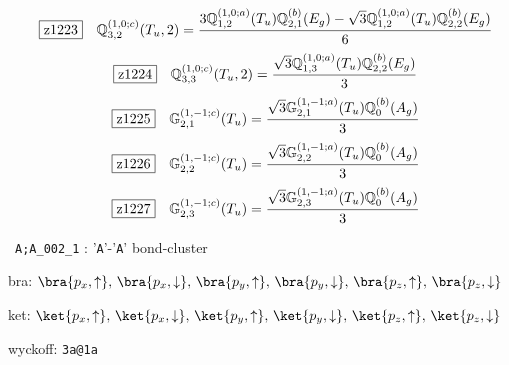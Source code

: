 \documentclass[fleqn,10pt,landscape]{jsarticle}
\begin{document}
\begin{dmath*}
\hspace*{3mm}\fbox{z1223}\quad \mathbb{Q}_{3,2}^{(1,0;c)}(T_{u},2)=\frac{3 \mathbb{Q}_{1,2}^{(1,0;a)}(T_{u}) \mathbb{Q}_{2,1}^{(b)}(E_{g}) - \sqrt{3} \mathbb{Q}_{1,2}^{(1,0;a)}(T_{u}) \mathbb{Q}_{2,2}^{(b)}(E_{g})}{6}
\end{dmath*}
\begin{dmath*}
\hspace*{3mm}\fbox{z1224}\quad \mathbb{Q}_{3,3}^{(1,0;c)}(T_{u},2)=\frac{\sqrt{3} \mathbb{Q}_{1,3}^{(1,0;a)}(T_{u}) \mathbb{Q}_{2,2}^{(b)}(E_{g})}{3}
\end{dmath*}
\begin{dmath*}
\hspace*{3mm}\fbox{z1225}\quad \mathbb{G}_{2,1}^{(1,-1;c)}(T_{u})=\frac{\sqrt{3} \mathbb{G}_{2,1}^{(1,-1;a)}(T_{u}) \mathbb{Q}_{0}^{(b)}(A_{g})}{3}
\end{dmath*}
\begin{dmath*}
\hspace*{3mm}\fbox{z1226}\quad \mathbb{G}_{2,2}^{(1,-1;c)}(T_{u})=\frac{\sqrt{3} \mathbb{G}_{2,2}^{(1,-1;a)}(T_{u}) \mathbb{Q}_{0}^{(b)}(A_{g})}{3}
\end{dmath*}
\begin{dmath*}
\hspace*{3mm}\fbox{z1227}\quad \mathbb{G}_{2,3}^{(1,-1;c)}(T_{u})=\frac{\sqrt{3} \mathbb{G}_{2,3}^{(1,-1;a)}(T_{u}) \mathbb{Q}_{0}^{(b)}(A_{g})}{3}
\end{dmath*}
\vspace{5mm}

\noindent\textbullet\, \texttt{A;A_002_1} : '\texttt{A}'-'\texttt{A}' bond-cluster

\noindent\quad * bra: $\bra{p_{x},\uparrow},\, \bra{p_{x},\downarrow},\, \bra{p_{y},\uparrow},\, \bra{p_{y},\downarrow},\, \bra{p_{z},\uparrow},\, \bra{p_{z},\downarrow}$

\noindent\quad * ket: $\ket{p_{x},\uparrow},\, \ket{p_{x},\downarrow},\, \ket{p_{y},\uparrow},\, \ket{p_{y},\downarrow},\, \ket{p_{z},\uparrow},\, \ket{p_{z},\downarrow}$

\noindent\quad * wyckoff: \texttt{3a@1a}
\end{document}
